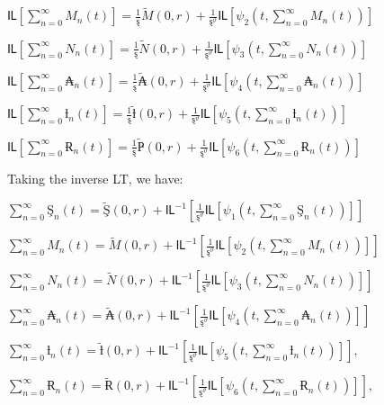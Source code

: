 \(Ỻ\left\lbrack \sum_{n = 0}^{\infty}{}M_{n}(t) \right\rbrack = \frac{1}{ȿ}\widetilde{M}(0,r) + \frac{1}{ȿ^{\vartheta}}Ỻ\left\lbrack \psi_{2}\left( t,\sum_{n = 0}^{\infty}{}M_{n}(t) \right) \right\rbrack\)

\(Ỻ\left\lbrack \sum_{n = 0}^{\infty}{}N_{n}(t) \right\rbrack = \frac{1}{ȿ}\widetilde{N}(0,r) + \frac{1}{ȿ^{\vartheta}}Ỻ\left\lbrack \psi_{3}\left( t,\sum_{n = 0}^{\infty}{}N_{n}(t) \right) \right\rbrack\)

\(Ỻ\left\lbrack \sum_{n = 0}^{\infty}{}₳_{n}(t) \right\rbrack = \frac{1}{ȿ}\widetilde{₳}(0,r) + \frac{1}{ȿ^{\vartheta}}Ỻ\left\lbrack \psi_{4}\left( t,\sum_{n = 0}^{\infty}{}₳_{n}(t) \right) \right\rbrack\)

\(Ỻ\left\lbrack \sum_{n = 0}^{\infty}{}ƚ_{n}(t) \right\rbrack = \frac{1}{ȿ}\widetilde{ƚ}(0,r) + \frac{1}{ȿ^{\vartheta}}Ỻ\left\lbrack \psi_{5}\left( t,\sum_{n = 0}^{\infty}{}ƚ_{n}(t) \right) \right\rbrack\)

\(Ỻ\left\lbrack \sum_{n = 0}^{\infty}{}Ɍ_{n}(t) \right\rbrack = \frac{1}{ȿ}\widetilde{Ҏ}(0,r) + \frac{1}{ȿ^{\vartheta}}Ỻ\left\lbrack \psi_{6}\left( t,\sum_{n = 0}^{\infty}{}Ɍ_{n}(t) \right) \right\rbrack\)

Taking the inverse LT, we have:

\(\sum_{n = 0}^{\infty}{}Ş_{n}(t) = \widetilde{Ş}(0,r) + Ỻ^{- 1}\left\lbrack \frac{1}{ȿ^{\vartheta}}Ỻ\left\lbrack \psi_{1}\left( t,\sum_{n = 0}^{\infty}{}Ş_{n}(t) \right) \right\rbrack \right\rbrack\)

\(\sum_{n = 0}^{\infty}{}M_{n}(t) = \widetilde{M}(0,r) + Ỻ^{- 1}\left\lbrack \frac{1}{ȿ^{\vartheta}}Ỻ\left\lbrack \psi_{2}\left( t,\sum_{n = 0}^{\infty}{}M_{n}(t) \right) \right\rbrack \right\rbrack\)

\(\sum_{n = 0}^{\infty}{}N_{n}(t) = \widetilde{N}(0,r) + Ỻ^{- 1}\left\lbrack \frac{1}{ȿ^{\vartheta}}Ỻ\left\lbrack \psi_{3}\left( t,\sum_{n = 0}^{\infty}{}N_{n}(t) \right) \right\rbrack \right\rbrack\)

\(\sum_{n = 0}^{\infty}{}₳_{n}(t) = \widetilde{₳}(0,r) + Ỻ^{- 1}\left\lbrack \frac{1}{ȿ^{\vartheta}}Ỻ\left\lbrack \psi_{4}\left( t,\sum_{n = 0}^{\infty}{}₳_{n}(t) \right) \right\rbrack \right\rbrack\)

\(\sum_{n = 0}^{\infty}{}ƚ_{n}(t) = \widetilde{ƚ}(0,r) + Ỻ^{- 1}\left\lbrack \frac{1}{ȿ^{\vartheta}}Ỻ\left\lbrack \psi_{5}\left( t,\sum_{n = 0}^{\infty}{}ƚ_{n}(t) \right) \right\rbrack \right\rbrack,\)

\(\sum_{n = 0}^{\infty}{}Ɍ_{n}(t) = \widetilde{Ɍ}(0,r) + Ỻ^{- 1}\left\lbrack \frac{1}{ȿ^{\vartheta}}Ỻ\left\lbrack \psi_{6}\left( t,\sum_{n = 0}^{\infty}{}Ɍ_{n}(t) \right) \right\rbrack \right\rbrack,\)


